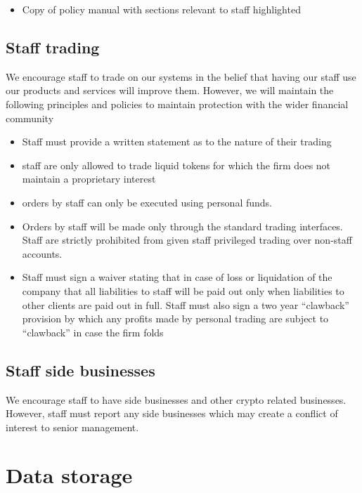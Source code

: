 \begin{itemize}
  \item Copy of policy manual with sections relevant to staff
    highlighted
\end{itemize}

\subsection{Staff trading}

We encourage staff to trade on our systems in the belief that having
our staff use our products and services will improve them.
However, we will maintain the following principles and policies to
maintain protection with the wider financial community

\begin{itemize}
 \item Staff must provide a written statement as to the nature of
   their trading
  \item staff are only allowed to trade liquid tokens for which the
    firm does not maintain a proprietary interest
  \item orders by staff can only be executed using personal funds.
  \item Orders by staff will be made only through the standard trading
    interfaces.  Staff are strictly prohibited from given staff
    privileged trading over non-staff accounts.
  \item Staff must sign a waiver stating that in case of loss or
    liquidation of the company that all liabilities to staff will be
    paid out only when liabilities to other clients are paid out in
    full.  Staff must also sign a two year ``clawback'' provision by
    which any profits made by personal trading are subject to
    ``clawback'' in case the firm folds
\end{itemize}

\subsection{Staff side businesses}
We encourage staff to have side businesses and other crypto related
businesses.  However, staff must report any side businesses which may
create a conflict of interest to senior management.


\section{Data storage}
